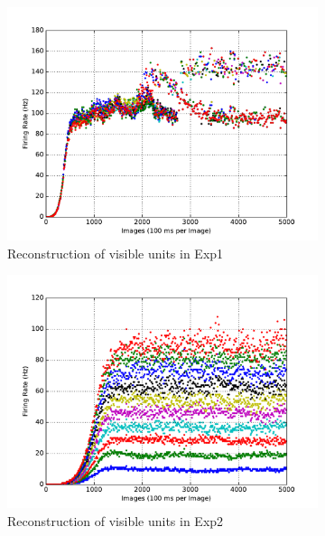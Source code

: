 \begin{figure}
\begin{subfigure}[t]{0.4\textwidth}
		\includegraphics[width=\textwidth]{pics_sdlm/15_exp_SRBM_teach_long/exp1_recon_s.pdf}
		\caption{Reconstruction of visible units in Exp1}
	\end{subfigure}
	\begin{subfigure}[t]{0.4\textwidth}
		\includegraphics[width=\textwidth]{pics_sdlm/15_exp_SRBM_teach_long/exp2_recon_s.pdf}
		\caption{Reconstruction of visible units in Exp2}
	\end{subfigure}\\
	\begin{subfigure}[t]{0.4\textwidth}

\end{subfigure}
\end{figure}
